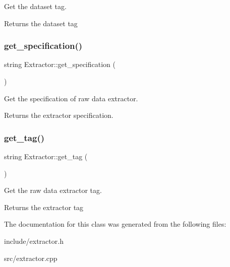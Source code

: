 Get the dataset tag. \begin{DoxyReturn}{Returns}
the dataset tag 
\end{DoxyReturn}
\mbox{\label{classExtractor_ad2576ada89be5c806e8f0cbc319e8f19}} 
\subsubsection{\texorpdfstring{get\+\_\+specification()}{get\_specification()}}
{\footnotesize\ttfamily string Extractor\+::get\+\_\+specification (\begin{DoxyParamCaption}{ }\end{DoxyParamCaption})}

Get the specification of raw data extractor. \begin{DoxyReturn}{Returns}
the extractor specification. 
\end{DoxyReturn}
\mbox{\label{classExtractor_ad23a148dddb5a78557b84baa00829fc4}} 
\subsubsection{\texorpdfstring{get\+\_\+tag()}{get\_tag()}}
{\footnotesize\ttfamily string Extractor\+::get\+\_\+tag (\begin{DoxyParamCaption}{ }\end{DoxyParamCaption})}

Get the raw data extractor tag. \begin{DoxyReturn}{Returns}
the extractor tag 
\end{DoxyReturn}


The documentation for this class was generated from the following files\+:\begin{DoxyCompactItemize}
\item 
include/extractor.\+h\item 
src/extractor.\+cpp\end{DoxyCompactItemize}
